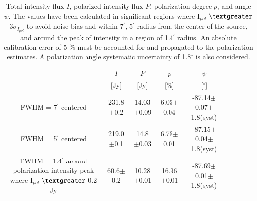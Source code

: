 \documentclass[twocolumn,traditabstract]{aa}
\begin{document}
\begin{table}
  \centering
      \begin{tabular}{ccccccccc}
      \hline
      \hline
       & $I$ & $P$ & $p$ & $\psi$  \\ 
                                         & [Jy]         &    [Jy]         & [\%]  & [$^\circ$] \\
      \hline
      \hline
    FWHM = 7$^{\prime}$ centered   & 231.8$\pm$0.2  & 14.03$\pm$0.09 & 6.05$\pm$0.04 & -87.14$\pm$0.07$\pm$1.8(syst)  \\ 
 
          FWHM = 5$^{\prime}$ centered & 219.0$\pm$0.1  & 14.8 $\pm$0.03 & 6.78$\pm$0.01 & -87.15$\pm$0.04$\pm$1.8(syst)    \\ 
     	      
              FWHM = 1.4$^{\prime}$ around polarization intensity peak where I$_{pol}$ $\textgreater$ 0.2 Jy& 60.6$\pm$0.2 & 10.28$\pm$0.01  & 16.96$\pm$0.01 &-87.69$\pm$0.01$\pm$1.8(syst)\\
              
             
                \hline            
    \hline   
    \end{tabular}
   \caption{ Total intensity flux $I$, polarized intensity flux $P$,
     polarization degree $p$, and angle $\psi$. The values have been calculated
     in significant regions where I$_{pol}$ $\textgreater$ 3$\sigma_{I_{pol}}$ to avoid noise bias and within 7$^{\prime}$, 5$^{\prime}$ radius from the center of the source, and around
     the peak of intensity in a region of 1.4$^{\prime}$ radius. An absolute
     calibration error of 5 $\%$ must be accounted for and propagated to the
     polarization estimates. A polarization angle systematic uncertainty of
     1.8$^{\circ}$ is also considered.
    }
    \label{tab:crab_results}
 \end{table}
 
\end{document}
